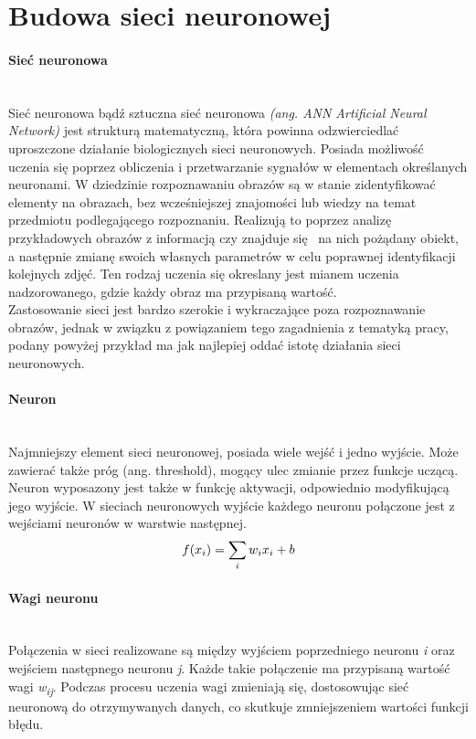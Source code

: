 \section{Budowa sieci neuronowej}
\paragraph{Sieć neuronowa} \mbox{}\\
Sieć neuronowa bądź sztuczna sieć neuronowa \textit{(ang. ANN Artificial Neural Network)}
jest strukturą matematyczną, która powinna odzwierciedlać uproszczone działanie biologicznych
sieci neuronowych. Posiada możliwość uczenia się poprzez obliczenia i przetwarzanie sygnałów
w elementach określanych neuronami. W dziedzinie rozpoznawaniu obrazów są w stanie zidentyfikować
elementy na obrazach, bez wcześniejszej znajomości lub wiedzy na temat przedmiotu podlegającego
rozpoznaniu. Realizują to poprzez analizę przykładowych obrazów z informacją czy znajduje się 
na nich pożądany obiekt, a następnie zmianę swoich własnych parametrów w celu poprawnej
identyfikacji kolejnych zdjęć. Ten rodzaj uczenia się okreslany jest mianem uczenia nadzorowanego,
gdzie każdy obraz ma przypisaną wartość.\\
Zastosowanie sieci jest bardzo szerokie i wykraczające poza rozpoznawanie obrazów, jednak
w związku z powiązaniem tego zagadnienia z tematyką pracy, podany powyżej przykład ma
jak najlepiej oddać istotę działania sieci neuronowych.

\paragraph{Neuron} \mbox{}\\
Najmniejszy element sieci neuronowej, posiada wiele wejść i jedno wyjście. Może
zawierać także próg (ang. threshold), mogący ulec zmianie przez funkcje uczącą.
Neuron wyposazony jest także w funkcję aktywacji, odpowiednio modyfikującą jego wyjście.
W sieciach neuronowych wyjście każdego neuronu połączone jest z wejściami neuronów
w warstwie następnej.
\begin{equation}
f(x_{i}) = \sum_{i}w_{i}x_{i} + b \\
\end{equation}

\paragraph{Wagi neuronu} \mbox{}\\
Połączenia w sieci realizowane są między wyjściem poprzedniego neuronu \textit{i}
oraz wejściem następnego neuronu \textit{j}. Każde takie połączenie ma przypisaną
wartość wagi \textit{w\textsubscript{ij}}. Podczas procesu uczenia wagi zmieniają
się, dostosowując sieć neuronową do otrzymywanych danych, co skutkuje
zmniejszeniem wartości funkcji błędu.

